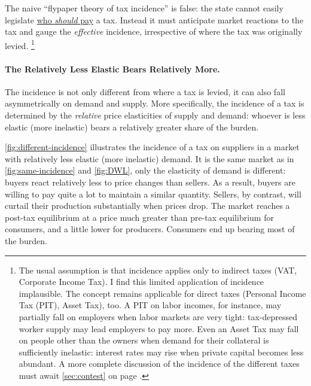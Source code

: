 The naive ``flypaper theory of tax incidence'' is false:
the state cannot easily legislate \href{sec:fiscal-redistributionIsPersonal}{who \emph{should} pay} a tax.
Instead it must anticipate market reactions to the tax and gauge the \emph{effective} incidence, irrespective of where the tax was originally levied.
\footnote{
	The usual assumption is that incidence applies only to indirect taxes (VAT, Corporate Income Tax).
	I find this limited application of incidence implausible.
	The concept remains applicable for direct taxes (Personal Income Tax (PIT), Asset Tax), too.
	A PIT on labor incomes, for instance, may partially fall on employers when labor markets are very tight:
	tax-depressed worker supply may lead employers to pay more.
	Even an Asset Tax may fall on people other than the owners when demand for their collateral is sufficiently inelastic:
	interest rates may rise when private capital becomes less abundant.
	A more complete discussion of the incidence of the different taxes must await \autoref{sec:contest} on page \pageref{sec:contest}.
}

\paragraph{The Relatively Less Elastic Bears Relatively More.}
The incidence is not only different from where a tax is levied, it can also fall asymmetrically on demand and supply.
More specifically, the incidence of a tax is determined by the \emph{relative} price elasticities of supply and demand:
whoever is less elastic (more inelastic) bears a relatively greater share of the burden.

\autoref{fig:different-incidence} illustrates the incidence of a tax on suppliers in a market with relatively less elastic (more inelastic) demand.
It is the same market as in \autoref{fig:same-incidence} and \ref{fig:DWL}, only the elasticity of demand is different:
buyers react relatively less to price changes than sellers.
As a result, buyers are willing to pay quite a lot to maintain a similar quantity.
Sellers, by contrast, will curtail their production substantially when prices drop.
The market reaches a post-tax equilibrium at a price much greater than pre-tax equilibrium for consumers, and a little lower for producers.
Consumers end up bearing most of the burden.




